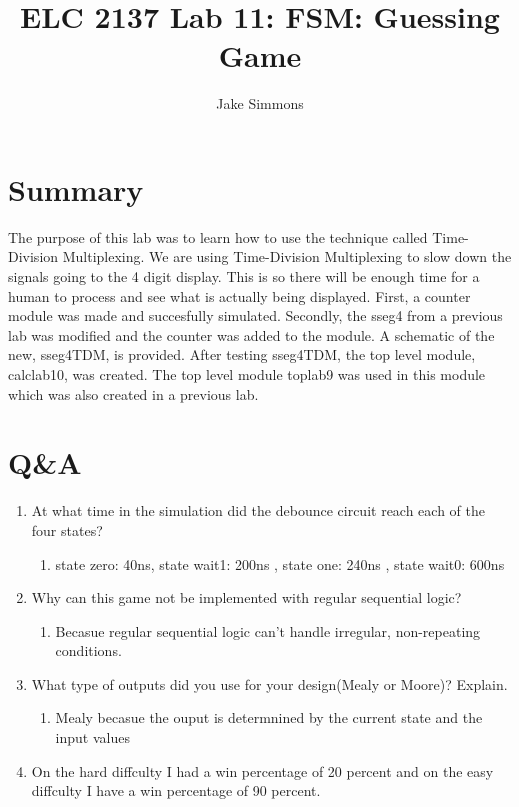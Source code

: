 \documentclass[11pt]{article}
\begin{document}
\title{ELC 2137 Lab 11: FSM: Guessing Game}
\author{Jake Simmons}

\maketitle


\section*{Summary}

The purpose of this lab was to learn how to use the technique called Time-Division Multiplexing. We are using Time-Division Multiplexing to slow down the signals going to the 4 digit display. This is so there will be enough time for a human to process and see what is actually being displayed. First, a counter module was made and succesfully simulated. Secondly, the sseg4 from a previous lab was modified and the counter was added to the module. A schematic of the new, sseg4TDM, is provided. After testing sseg4TDM, the top level module, calclab10, was created. The top level module toplab9 was used in this module which was also created in a previous lab.  

\clearpage
\section*{Q\&A}

\begin{enumerate}
		\item At what time in the simulation did the debounce circuit reach each of the four states?
		\begin{enumerate}
			\item 	state zero: 40ns, state wait1: 200ns , state one: 240ns , state wait0: 600ns 
		\end{enumerate}
	
	\item Why can this game not be implemented with regular sequential logic?
		\begin{enumerate}
			\item 	Becasue regular sequential logic can't handle irregular, non-repeating conditions.
		\end{enumerate}

	\item What type of outputs did you use for your design(Mealy or Moore)? Explain.
	\begin{enumerate}
		\item Mealy becasue the ouput is determnined by the current state and the input values
	\end{enumerate}
	\item On the hard diffculty I had a win percentage of 20 percent and on the easy diffculty I have a win percentage of 90 percent.
\end{enumerate}
\end{document}
